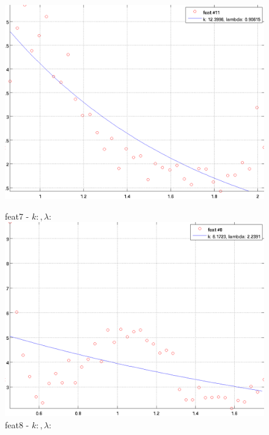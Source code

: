 \documentclass[12pt]{report}
\begin{document}
\begin{figure}
\begin{minipage}[t]{0.5\linewidth}
	\includegraphics[scale=\imFeatScale, angle=\imFeatAngle]{images/feat11}\\
\end{minipage}
\begin{minipage}[t]{0.5\linewidth}
	\centering
	feat7 - $k: , \lambda:  $\\
	\includegraphics[scale=\imFeatScale, angle=\imFeatAngle]{images/feat8}\\
	feat8 - $k: , \lambda:  $\\

\end{minipage}
\end{figure}
\end{document}
